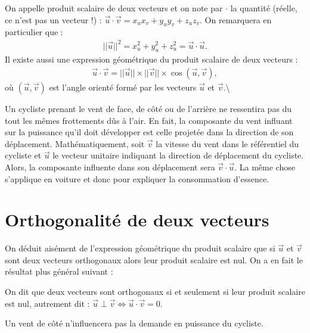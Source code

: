 \documentclass[letterpaper,10pt,english]{jupyterBook}
\begin{document}
\sphinxAtStartPar
On appelle produit scalaire de deux vecteurs et on note par \(\cdot\) la quantité (réelle, ce n’est pas un vecteur !) :
\(\vec{u} \cdot \vec{v} = x_u x_v + y_u y_v + z_u z_v.\)
On remarquera en particulier que :
\begin{equation*}
\begin{split}||\vec{u}||^2 = x_u^2 + y_u^2 + z_u^2 = \vec{u}\cdot\vec{u}.\end{split}
\end{equation*}
\sphinxAtStartPar
Il existe aussi une expression géométrique du produit scalaire de deux vecteurs :
\begin{equation*}
\begin{split}
\vec{u} \cdot \vec{v} = ||\vec{u}|| \times ||\vec{v}|| \times \cos(\vec{u},\vec{v}),
\end{split}
\end{equation*}
\sphinxAtStartPar
où \((\vec{u},\vec{v})\) est l’angle orienté formé par les vecteurs \(\vec{u}\) et \(\vec{v}\).\textbackslash{}

\sphinxAtStartPar
{} Un cycliste prenant le vent de face, de côté ou de l’arrière ne ressentira pas du tout les mêmes frottements dûs à l’air. En fait, la composante du vent influant sur la puissance qu’il doit développer est celle projetée dans la direction de son déplacement. Mathématiquement, soit \(\vec{v}\) la vitesse du vent dans le référentiel du cycliste et \(\vec{u}\) le vecteur unitaire indiquant la direction de déplacement du cycliste. Alors, la composante influente dans son déplacement sera \(\vec{v} \cdot \vec{u}\). La même chose s’applique en voiture et donc pour expliquer la consommation d’essence.


\section{Orthogonalité de deux vecteurs}
\label{\detokenize{Part1/Cours:orthogonalite-de-deux-vecteurs}}
\sphinxAtStartPar
On déduit aisément de l’expression géométrique du produit scalaire que si \(\vec{u}\) et \(\vec{v}\) sont deux vecteurs orthogonaux alors leur produit scalaire est nul. On a en fait le résultat plus général suivant :

\sphinxAtStartPar
{} On dit que deux vecteurs sont orthogonaux si et seulement si leur produit scalaire est nul, autrement dit :
\(\vec{u} \perp \vec{v} \Leftrightarrow \vec{u} \cdot \vec{v} =0.\)

\sphinxAtStartPar
{} Un vent de côté n’influencera pas la demande en puissance du cycliste.
\end{document}
